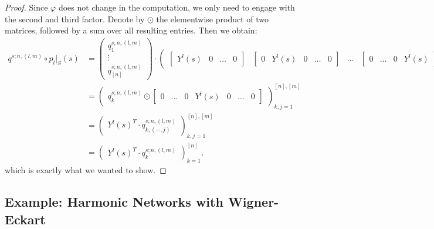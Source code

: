\documentclass[12pt, a4paper]{article}
\theoremstyle{plain}
\theoremstyle{definition}
\theoremstyle{remark}
\begin{document}
\begin{proof}
Since $\varphi$ does not change in the computation, we only need to engage with the second and third factor. Denote by $\odot$ the elementwise product of two matrices, followed by a sum over all resulting entries. Then we obtain:
\begin{align*}
q^{s;n,(l,m)} \circ p_l|_S(s) & = 
\begin{pmatrix}
q^{s;n,(l,m)}_1 \\
\vdots \\
q^{s;n,(l,m)}_{[n]}
\end{pmatrix} \cdot  \begin{pmatrix}
\begin{bmatrix}
Y^l(s) & 0 & \hdots & 0
\end{bmatrix}
&
\begin{bmatrix}
0 & Y^l(s) & 0 & \hdots & 0
\end{bmatrix}
&
\hdots
&
\begin{bmatrix}
0 & \hdots & 0 & Y^l(s)
\end{bmatrix}
\end{pmatrix}\\
& = 
\begin{pmatrix}
q^{s;n,(l,m)}_{k} \odot \begin{bmatrix}0 & \hdots & 0 & Y^l(s) & 0 & \hdots & 0 \end{bmatrix}
\end{pmatrix}_{k, j = 1}^{[n], [m]} \\
& = \begin{pmatrix}
Y^l(s)^T \cdot q^{s;n,(l,m)}_{k, (-,j)}
\end{pmatrix}_{k, j = 1}^{[n], [m]} \\
& = \begin{pmatrix}
Y^l(s)^T \cdot q^{s;n,(l,m)}_{k}
\end{pmatrix}_{k=1}^{[n]},
\end{align*}
which is exactly what we wanted to show.
\end{proof}

\subsection{Example: Harmonic Networks with Wigner-Eckart}
\end{document}
